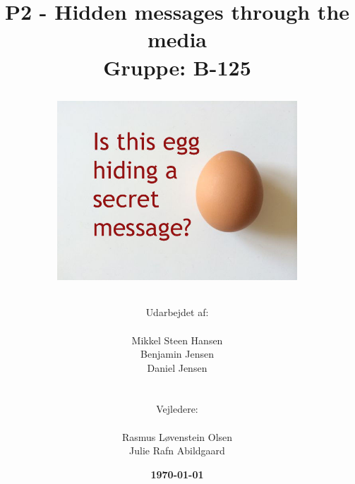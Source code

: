 \documentclass[11pt]{article}
\title{
    P2 - Hidden messages through the media 
    \\ 
    Gruppe: B-125
    \\
    \begin{figure}[!h]
        \centering
        \includegraphics[width=0.8\textwidth, angle =0]{Projectdoc/Egg-Message.jpg}
        \label{fig:FrontPage}
    \end{figure}
}
\author{
    Udarbejdet af:\\
    \\
    Mikkel Steen Hansen\\
    Benjamin Jensen\\
    Daniel Jensen\\
    \\\\
    Vejledere:\\ 
    \\
    Rasmus Løvenstein Olsen\\
    Julie Rafn Abildgaard\\
}
\date{\textbf{\today}}
\renewcommand{\baselinestretch}{1.20}
\begin{document}
    \begin{titlepage}
        \clearpage
        \maketitle
        \thispagestyle{empty}
    \end{titlepage}
    
    
    
    \renewcommand{\baselinestretch}{0.8} 
    \tableofcontents
    \renewcommand{\baselinestretch}{1.20} 
    \newpage
    
    
    
    
    
    
    
    
    
    
    \newpage
    
    
    \newpage
    
    
    
    
    
    
    
    
    
    
    
    
    \newpage
    
    
    
    
    
\end{document}
